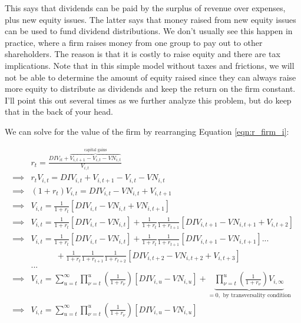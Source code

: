 \documentclass[letterpaper,12pt]{article}
\theoremstyle{definition}
\begin{document}
\begin{spacing}{1.5}
This says that dividends can be paid by the surplus of revenue over expenses, plus new equity issues.  The latter says that money raised from new equity issues can be used to fund dividend distributions.  We don't usually see this happen in practice, where a firm raises money from one group to pay out to other shareholders.  The reason is that it is costly to raise equity and there are tax implications.  Note that in this simple model without taxes and frictions, we will not be able to determine the amount of equity raised since they can always raise more equity to distribute as dividends and keep the return on the firm constant.  I'll point this out several times as we further analyze this problem, but do keep that in the back of your head.

We can solve for the value of the firm by rearranging Equation \ref{eqn:r_firm_i}:

\begin{equation}
\label{eqn:derive_v}
\begin{split}
&r_{t} = \frac{DIV_{it} + \overbrace{V_{i,t+1}-V_{i,t}-VN_{i,t}}^{\text{capital gains}}}{V_{i,t}}\\
\implies & r_{t} V_{i,t} = DIV_{i,t} + V_{i,t+1} - V_{i,t} - VN_{i,t} \\
\implies & (1+r_{t})V_{i,t} = DIV_{i,t} - VN_{i,t} + V_{i,t+1} \\
\implies & V_{i,t} = \frac{1}{1+r_{t}}\left[DIV_{i,t}-VN_{i,t} + VN_{i,t+1}\right] \\
\implies & V_{i,t} = \frac{1}{1+r_{t}}\left[DIV_{i,t}-VN_{i,t}\right]+ \frac{1}{1+r_{t}}\frac{1}{1+r_{t+1}}\left[DIV_{i,t+1}-VN_{i,t+1} + V_{i,t+2}\right] \\
\implies & V_{i,t} =  \frac{1}{1+r_{t}}\left[DIV_{i,t}-VN_{i,t}\right]+ \frac{1}{1+r_{t}}\frac{1}{1+r_{t+1}}\left[DIV_{i,t+1}-VN_{i,t+1}\right] ... \\
 & \quad\quad\quad + \frac{1}{1+r_{t}}\frac{1}{1+r_{t+1}}\frac{1}{1+r_{t+2}}\left[DIV_{i,t+2}-VN_{i,t+2}+ V_{i,t+3}\right] \\
&... \\
\implies & V_{i,t} = \sum_{u=t}^{\infty}\prod_{\nu=t}^{u} \left(\frac{1}{1+r_{\nu}}\right)\left[DIV_{i,u}-VN_{i,u}\right] + \underbrace{\prod_{\nu=t}^{u} \left(\frac{1}{1+r_{\nu}}\right)V_{i,\infty}}_{=0,\text{ by transversality condition}}\\
\implies & V_{i,t} = \sum_{u=t}^{\infty}\prod_{\nu=t}^{u} \left(\frac{1}{1+r_{\nu}}\right)\left[DIV_{i,u}-VN_{i,u}\right] 
\end{split}
\end{equation}


\end{spacing}
\end{document}
